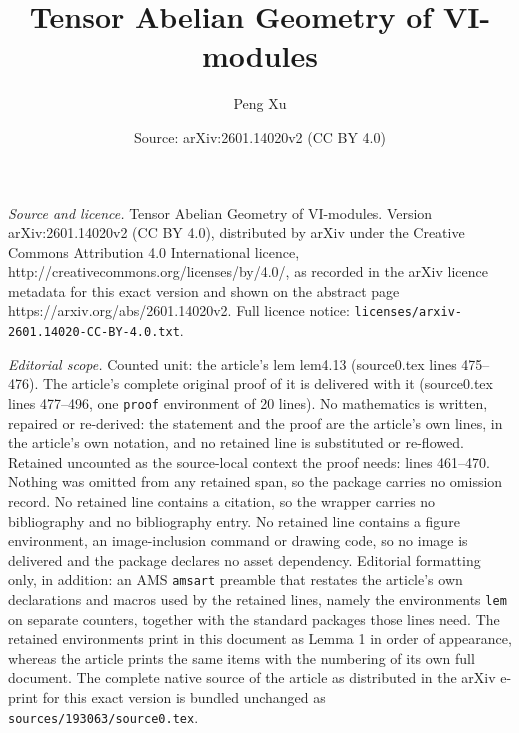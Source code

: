 \documentclass[10pt,a4paper]{amsart}
\title{Tensor Abelian Geometry of VI-modules}
\author{Peng Xu}
\date{Source: arXiv:2601.14020v2 (CC BY 4.0)}
\begin{document}
\maketitle

\noindent\emph{Source and licence.} Tensor Abelian Geometry of VI-modules. Version arXiv:2601.14020v2 (CC BY 4.0), distributed by arXiv under the Creative Commons Attribution 4.0 International licence, http://creativecommons.org/licenses/by/4.0/, as recorded in the arXiv licence metadata for this exact version and shown on the abstract page https://arxiv.org/abs/2601.14020v2. Full licence notice: \texttt{licenses/arxiv-2601.14020-CC-BY-4.0.txt}.\par\smallskip

\noindent\textit{Editorial scope.} Counted unit: the article's lem lem4.13 (source0.tex lines 475--476). The article's complete original proof of it is delivered with it (source0.tex lines 477--496, one \texttt{proof} environment of 20 lines). No mathematics is written, repaired or re-derived: the statement and the proof are the article's own lines, in the article's own notation, and no retained line is substituted or re-flowed.  Retained uncounted as the source-local context the proof needs: lines 461--470.  Nothing was omitted from any retained span, so the package carries no omission record.  No retained line contains a citation, so the wrapper carries no bibliography and no bibliography entry.  No retained line contains a figure environment, an image-inclusion command or drawing code, so no image is delivered and the package declares no asset dependency.  Editorial formatting only, in addition: an AMS \texttt{amsart} preamble that restates the article's own declarations and macros used by the retained lines, namely the environments \texttt{lem} on separate counters, together with the standard packages those lines need.  The retained environments print in this document as Lemma 1 in order of appearance, whereas the article prints the same items with the numbering of its own full document.  The complete native source of the article as distributed in the arXiv e-print for this exact version is bundled unchanged as \texttt{sources/193063/source0.tex}.
\end{document}
